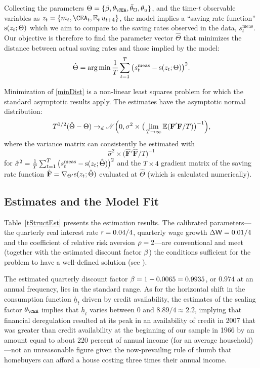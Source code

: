 \documentclass[titlepage]{\econtex}
\DeclareMathOperator*{\argmin}{arg\,min}
\begin{document}
Collecting the parameters $\Theta=\{\DiscFac,\theta_\CEA,\bar{\theta}_\mho,\theta_u\}$, and the time-$t$ observable variables as $z_{t} = \{\mRat_{t},\CEA_{t},\Ex_{t}u_{t+4}\}$, the model implies a ``saving rate function'' $\mathrm{s}(z_{t};\Theta)$ which we aim to compare to the saving rates observed in the data, $s_t^{\text{meas}}$. Our objective is therefore to find the parameter vector $\hat{\Theta}$ that minimizes the distance between actual saving rates and those implied by the model:
\begin{equation}
  \hat{\Theta}=\argmin \frac{1}{T}\sum_{t=1}^T\big(s_{t}^{\text{meas}}-\sFunc(z_{t}; \Theta)\big)^2. \label{minDist}
\end{equation}

Minimization of \eqref{minDist} is a non-linear least squares problem for which the standard asymptotic results apply. The estimates have the asymptotic normal distribution:
$$
T^{1/2}(\hat{\Theta}-\Theta)\rightarrow_d \mathscr{N}\Big(0, \sigma^2\times\big(\lim_{T\rightarrow\infty} \operatorname{\mathbb{E}} (\textbf{F}'\textbf{F}/T)\big)^{-1}\Big),
$$
where the variance matrix can consistently be estimated with
$$
\hat\sigma^2\times\big( \hat{\textbf{F}}'\hat{\textbf{F}}\big/ T \big)^{-1}
$$
for $\hat\sigma^2=\frac{1}{T}\sum_{t=1}^T\big(s_{t}^{\text{meas}}-\mathrm{s}(z_{t}; \hat{\Theta})\big)^2$ and the $T\times4$ gradient matrix of the saving rate function $\hat{\textbf{F}}=\nabla_{\Theta'}\mathrm{s}(z_{t}; \hat{\Theta})$ evaluated at $\hat{\Theta}$ (which is calculated numerically).%

\subsection{Estimates and the Model Fit}

Table~\ref{tStructEst} presents the estimation results. The calibrated parameters---the quarterly real interest rate $\mathsf{r}=0.04/4$, quarterly wage growth $\Delta\mathsf{W}=0.01/4$ and the coefficient of relative risk aversion $\rho=2$---are conventional and meet (together with the estimated discount factor $\beta$) the conditions sufficient for the problem to have a well-defined solution (see \cite{ctDiscrete}).

The estimated quarterly discount factor $\beta=1-0.0065=0.9935$, or $0.974$ at an annual frequency, lies in the standard range.  As for the horizontal shift in the consumption function $\underline{h}_t$ driven by credit availability, the estimates of the scaling factor ${\theta}_\CEA$ implies that $\underline{h}_t$ varies between $0$ and $8.89/4\approx 2.2$, implying that financial deregulation resulted at its peak in an availability of credit in 2007 that was greater than credit availability at the beginning of our sample in 1966 by an amount equal to about 220 percent of annual income (for an average household)---not an unreasonable figure given the now-prevailing rule of thumb that homebuyers can afford a house costing three times their annual income.
\end{document}
